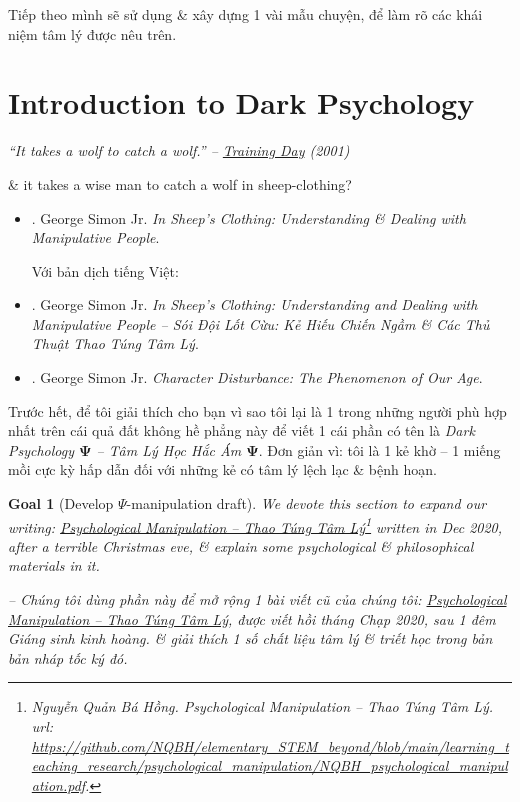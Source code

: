 \documentclass[12pt,twoside]{book}
\newtheorem{goal}{Goal}
\begin{document}
Tiếp theo mình sẽ sử dụng \& xây dựng 1 vài mẫu chuyện, để làm rõ các khái niệm tâm lý được nêu trên.

\section{Introduction to Dark Psychology}

\begin{flushright}\it
	``It takes a wolf to catch a wolf.'' -- \href{https://www.imdb.com/title/tt0139654/}{Training Day} (2001)
\end{flushright}
\& it takes a wise man to catch a wolf in sheep-clothing?

\begin{itemize}
	\item \cite{Simon_sheep}. {\sc George Simon Jr.} {\it In Sheep's Clothing: Understanding \& Dealing with Manipulative People}.
	
	Với bản dịch tiếng Việt:
	\item \cite{Simon_sheep_VN}. {\sc George Simon Jr.} {\it In Sheep's Clothing: Understanding and Dealing with Manipulative People -- Sói Đội Lốt Cừu: Kẻ Hiếu Chiến Ngầm \& Các Thủ Thuật Thao Túng Tâm Lý}.
	
	\item \cite{Simon_character}. {\sc George Simon Jr.} {\it Character Disturbance: The Phenomenon of Our Age}.
\end{itemize}
Trước hết, để tôi giải thích cho bạn vì sao tôi lại là 1 trong những người phù hợp nhất trên cái quả đất không hề phẳng này để viết 1 cái phần có tên là {\it Dark Psychology $\boldsymbol{\Psi}$ -- Tâm Lý Học Hắc Ám $\boldsymbol{\Psi}$}. Đơn giản vì: tôi là 1 kẻ khờ -- 1 miếng mồi cực kỳ hấp dẫn đối với những kẻ có tâm lý lệch lạc \& bệnh hoạn.

\begin{goal}[Develop $\Psi$-manipulation draft]
	We devote this section to expand our writing: \href{https://github.com/NQBH/elementary_STEM_beyond/blob/main/learning_teaching_research/psychological_manipulation/NQBH_psychological_manipulation.pdf}{Psychological Manipulation -- Thao Túng Tâm Lý}\footnote{{\sc Nguyễn Quản Bá Hồng}. {\it Psychological Manipulation -- Thao Túng Tâm Lý}.\\{\sc url}: \url{https://github.com/NQBH/elementary_STEM_beyond/blob/main/learning_teaching_research/psychological_manipulation/NQBH_psychological_manipulation.pdf}.} written in Dec 2020, after a terrible Christmas eve, \& explain some psychological \& philosophical materials in it.
	
	-- Chúng tôi dùng phần này để mở rộng 1 bài viết cũ của chúng tôi: \href{https://github.com/NQBH/elementary_STEM_beyond/blob/main/learning_teaching_research/psychological_manipulation/NQBH_psychological_manipulation.pdf}{Psychological Manipulation -- Thao Túng Tâm Lý}, được viết hồi tháng Chạp 2020, sau 1 đêm Giáng sinh kinh hoàng. \& giải thích 1 số chất liệu tâm lý \& triết học trong bản bản nháp tốc ký đó.
\end{goal}
\end{document}
